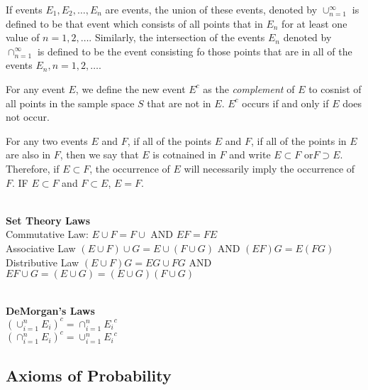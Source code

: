 \documentclass[11pt]{article} %
\newenvironment{definition}[1][Definition]{\begin{trivlist}
\item[\hskip \labelsep {\bfseries #1}]}{\end{trivlist}}
\newenvironment{formula}[1][Formula]{\begin{trivlist}
\item[\hskip \labelsep {\bfseries #1}]}{\end{trivlist}}
\begin{document}
\begin{definition}
	If events {$E_1, E_2, \ldots, E_n$} are events, the union of these events, denoted by {$\cup_{n = 1}^{\infty}$} is defined to be that event which consists of all points that in {$E_n$} for at least one value of {$n = 1, 2, \ldots$}. Similarly, the intersection of the events $E_n$ denoted by $\cap_{n =1}^{\infty}$ is defined to be the event consisting fo those points that are in all of the events $E_n, n = 1, 2, \ldots$. 
\end{definition}

\begin{definition}
	For any event $E$, we define the new event $E^c$ as the {\it complement} of $E$ to cosnist of all points in the sample space $S$ that are not in $E$. $E^c$ occurs if and only if $E$ does not occur. 
\end{definition}

\begin{definition}
	For any two events $E$ and $F$, if all of the points $E$ and $F$, if all of the points in $E$ are also in $F$, then we say that $E$ is cotnained in $F$ and write $E \subset F$ or$ F \supset E$. Therefore, if $E \subset F$, the occurrence of $E$ will necessarily imply the occurrence of $F$. IF $E \subset F$ and $F \subset E$, $E = F$.
\end{definition}

\begin{formula} 
	\mbox{} \\
	{\bf Set Theory Laws} \\
	Commutative Law: $E \cup F = F \cup$ AND $EF = FE$ \\
	Associative Law $(E \cup F) \cup G = E \cup (F \cup G) $ AND $ (EF)G = E(FG)$ \\
	Distributive Law $(E \cup F) G = EG \cup FG$ AND $EF \cup G = (E \cup G) = (E \cup G)(F \cup G)$


	\mbox{} \\
	{\bf DeMorgan's Laws} \\
	$(\cup_{i = 1}^{n}{E_i})^c = \cap_{i = 1}^{n}{E_i}^c$ \\
	$(\cap_{i =1}^{n}{E_i})^c = \cup_{i = 1}^{n}{E_i}^c$

\end{formula}

\subsection{Axioms of Probability}
\end{document}
